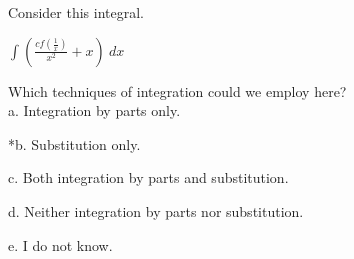 
Consider this integral.

\( \int ( \frac{ cf ( \frac{1}{x} ) }{ x^{2} } + x ) \ dx \)

Which techniques of integration could we employ here?\\


a. Integration by parts only.

*b. Substitution only.

c. Both integration by parts and substitution.

d. Neither integration by parts nor substitution.

e. I do not know.\\
